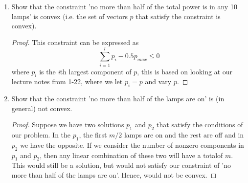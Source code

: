 \begin{enumerate}[label=(\alph*)]
{  }
  \item{Show that the constraint 'no more than half of the total power is in
    any 10 lamps' is convex (i.e. the set of vectors $p$ that satisfy the
    constraint is convex).
    \begin{proof}
      This constraint can be expressed as
      \[
      \sum_{i = 1}^{l} p_{i} - 0.5 p_{max} \leq 0
      \]
      where $p_{i}$ is the \textit{i}th largest component of $p$, this is based on looking at our lecture notes from 1-22, where we let $p_{i} = p$ and vary $p$.
    \end{proof}
  }
  \item{Show that the constraint 'no more than half of the lamps are on'
    is (in general) not convex.
    \begin{proof}
      Suppose we have two solutions $p_{1}$ and $p_{2}$ that satisfy the
      conditions of our problem. In the $p_{1}$, the first $m/2$ lamps are on
      and the rest are off and in $p_{2}$ we have the opposite. If we consider
      the number of nonzero components in $p_{1}$ and $p_{2}$, then any linear combination of these two  will have a totalof $m$. This would still be a solution, but would not satisfy our constraint of  'no more than half of the lamps are on'. Hence, would not be convex.
    \end{proof}
   }
  \end{enumerate}

